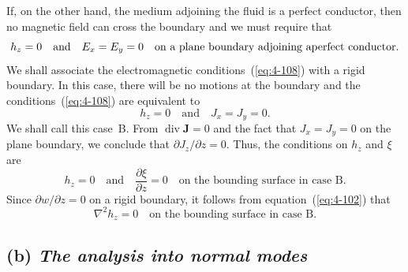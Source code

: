 If, on the other hand, the medium adjoining the fluid is a perfect conductor, then no magnetic field can cross the boundary and we must require that
\begin{equation}
\label{eq:4-108}
h_z = 0 \quad\text{and}\quad E_x = E_y = 0 \quad\text{on a plane boundary adjoining a}\\ \text{perfect conductor.}
\end{equation}
We shall associate the electromagnetic conditions~(\ref{eq:4-108}) with a rigid boundary. In this case, there will be no motions at the boundary and the conditions~(\ref{eq:4-108}) are equivalent to
\begin{equation}
\label{eq:4-109}
h_z = 0 \quad\text{and}\quad J_x = J_y = 0.
\end{equation}
We shall call this case~B. From $\operatorname{div}\mathbf{J}=0$ and the fact that $J_x=J_y=0$ on the plane boundary, we conclude that $\partial J_z/\partial z=0$. Thus, the conditions on $h_z$ and $\xi$ are
\begin{equation}
\label{eq:4-110}
h_z = 0 \quad\text{and}\quad \frac{\partial\xi}{\partial z} = 0 \quad \text{on the bounding surface in case~B.}
\end{equation}
Since $\partial w/\partial z = 0$ on a rigid boundary, it follows from equation~(\ref{eq:4-102}) that
\begin{equation}
\label{eq:4-111}
\nabla^2 h_z = 0 \quad \text{on the bounding surface in case~B.}
\end{equation}

\subsection*{(b) \emph{The analysis into normal modes}}

